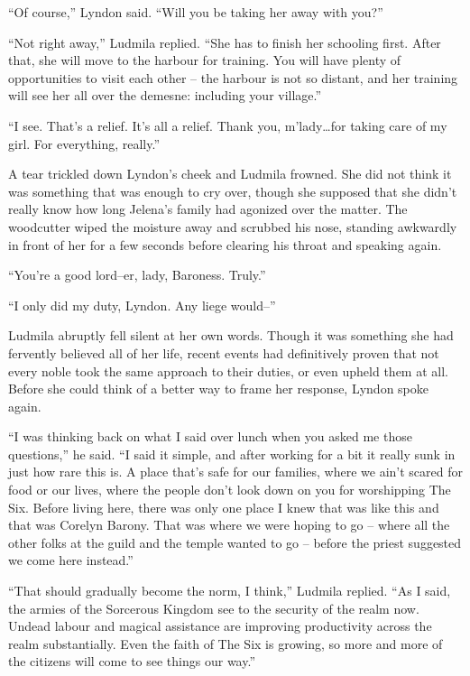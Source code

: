  

“Of course,” Lyndon said. “Will you be taking her away with you?”

 

“Not right away,” Ludmila replied. “She has to finish her schooling first. After that, she will move to the harbour for training. You will have plenty of opportunities to visit each other – the harbour is not so distant, and her training will see her all over the demesne: including your village.”

 

“I see. That’s a relief. It’s all a relief. Thank you, m’lady…for taking care of my girl. For everything, really.”

 

A tear trickled down Lyndon’s cheek and Ludmila frowned. She did not think it was something that was enough to cry over, though she supposed that she didn’t really know how long Jelena’s family had agonized over the matter. The woodcutter wiped the moisture away and scrubbed his nose, standing awkwardly in front of her for a few seconds before clearing his throat and speaking again.

 

“You’re a good lord–er, lady, Baroness. Truly.”

 

“I only did my duty, Lyndon. Any liege would–”

 

Ludmila abruptly fell silent at her own words. Though it was something she had fervently believed all of her life, recent events had definitively proven that not every noble took the same approach to their duties, or even upheld them at all. Before she could think of a better way to frame her response, Lyndon spoke again.

 

“I was thinking back on what I said over lunch when you asked me those questions,” he said. “I said it simple, and after working for a bit it really sunk in just how rare this is. A place that’s safe for our families, where we ain’t scared for food or our lives, where the people don’t look down on you for worshipping The Six. Before living here, there was only one place I knew that was like this and that was Corelyn Barony. That was where we were hoping to go – where all the other folks at the guild and the temple wanted to go – before the priest suggested we come here instead.”

 

“That should gradually become the norm, I think,” Ludmila replied. “As I said, the armies of the Sorcerous Kingdom see to the security of the realm now. Undead labour and magical assistance are improving productivity across the realm substantially. Even the faith of The Six is growing, so more and more of the citizens will come to see things our way.”

